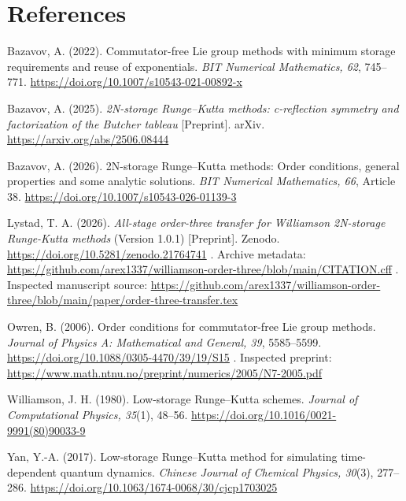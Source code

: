 \documentclass[
  11pt,
  a4paper,
]{scrartcl}
\begin{document}
\section{References}\label{references}

Bazavov, A. (2022). Commutator-free Lie group methods with minimum
storage requirements and reuse of exponentials. \emph{BIT Numerical
Mathematics, 62}, 745--771.
\url{https://doi.org/10.1007/s10543-021-00892-x}

Bazavov, A. (2025). \emph{2N-storage Runge--Kutta methods: c-reflection
symmetry and factorization of the Butcher tableau} {[}Preprint{]}.
arXiv. \url{https://arxiv.org/abs/2506.08444}

Bazavov, A. (2026). 2N-storage Runge--Kutta methods: Order conditions,
general properties and some analytic solutions. \emph{BIT Numerical
Mathematics, 66}, Article 38.
\url{https://doi.org/10.1007/s10543-026-01139-3}

Lystad, T. A. (2026). \emph{All-stage order-three transfer for
Williamson 2N-storage Runge-Kutta methods} (Version 1.0.1)
{[}Preprint{]}. Zenodo. \url{https://doi.org/10.5281/zenodo.21764741} .
Archive metadata:
\url{https://github.com/arex1337/williamson-order-three/blob/main/CITATION.cff}
. Inspected manuscript source:
\url{https://github.com/arex1337/williamson-order-three/blob/main/paper/order-three-transfer.tex}

Owren, B. (2006). Order conditions for commutator-free Lie group
methods. \emph{Journal of Physics A: Mathematical and General, 39},
5585--5599. \url{https://doi.org/10.1088/0305-4470/39/19/S15} .
Inspected preprint:
\url{https://www.math.ntnu.no/preprint/numerics/2005/N7-2005.pdf}

Williamson, J. H. (1980). Low-storage Runge--Kutta schemes.
\emph{Journal of Computational Physics, 35}(1), 48--56.
\url{https://doi.org/10.1016/0021-9991(80)90033-9}

Yan, Y.-A. (2017). Low-storage Runge--Kutta method for simulating
time-dependent quantum dynamics. \emph{Chinese Journal of Chemical
Physics, 30}(3), 277--286.
\url{https://doi.org/10.1063/1674-0068/30/cjcp1703025}
\end{document}
